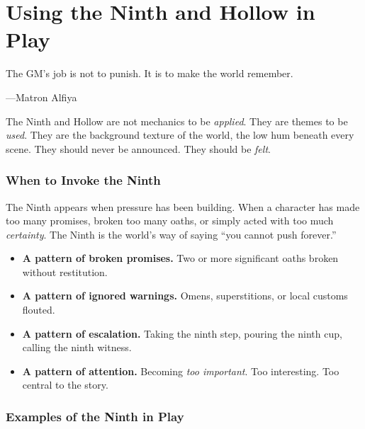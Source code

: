 \documentclass[11pt]{book}
\begin{document}
\chapter{Using the Ninth and Hollow in Play}

\epigraph{The GM's job is not to punish. It is to make the world remember.}{---Matron Alfiya}

The Ninth and Hollow are not mechanics to be \textit{applied}. They are themes to be \textit{used}. They are the background texture of the world, the low hum beneath every scene. They should never be announced. They should be \textit{felt}.

\subsection{When to Invoke the Ninth}

The Ninth appears when pressure has been building. When a character has made too many promises, broken too many oaths, or simply acted with too much \textit{certainty}. The Ninth is the world's way of saying ``you cannot push forever.''

\begin{tcolorbox}[colback=shadowpurple!5!white, colframe=shadowpurple!75!black, title=Triggers for the Ninth,breakable]
\begin{itemize}
  \item \textbf{A pattern of broken promises.} Two or more significant oaths broken without restitution.
  \item \textbf{A pattern of ignored warnings.} Omens, superstitions, or local customs flouted.
  \item \textbf{A pattern of escalation.} Taking the ninth step, pouring the ninth cup, calling the ninth witness.
  \item \textbf{A pattern of attention.} Becoming \textit{too important}. Too interesting. Too central to the story.
\end{itemize}
\end{tcolorbox}

\subsection{Examples of the Ninth in Play}
\end{document}
